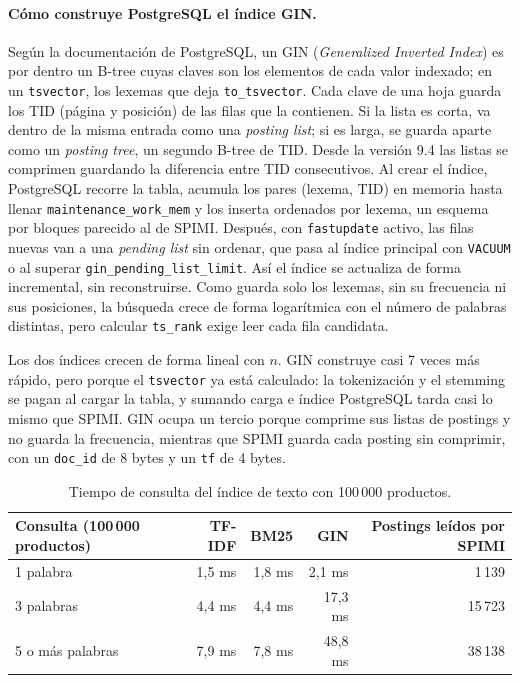 \documentclass[11pt,a4paper]{article}
\begin{document}
\paragraph{Cómo construye PostgreSQL el índice GIN.} Según la documentación de PostgreSQL, un GIN (\emph{Generalized Inverted Index}) es por dentro un B-tree cuyas claves son los elementos de cada valor indexado; en un \texttt{tsvector}, los lexemas que deja \texttt{to\_tsvector}. Cada clave de una hoja guarda los TID (página y posición) de las filas que la contienen. Si la lista es corta, va dentro de la misma entrada como una \emph{posting list}; si es larga, se guarda aparte como un \emph{posting tree}, un segundo B-tree de TID. Desde la versión 9.4 las listas se comprimen guardando la diferencia entre TID consecutivos. Al crear el índice, PostgreSQL recorre la tabla, acumula los pares (lexema, TID) en memoria hasta llenar \texttt{maintenance\_work\_mem} y los inserta ordenados por lexema, un esquema por bloques parecido al de SPIMI. Después, con \texttt{fastupdate} activo, las filas nuevas van a una \emph{pending list} sin ordenar, que pasa al índice principal con \texttt{VACUUM} o al superar \texttt{gin\_pending\_list\_limit}. Así el índice se actualiza de forma incremental, sin reconstruirse. Como guarda solo los lexemas, sin su frecuencia ni sus posiciones, la búsqueda crece de forma logarítmica con el número de palabras distintas, pero calcular \texttt{ts\_rank} exige leer cada fila candidata.

Los dos índices crecen de forma lineal con $n$. GIN construye casi 7 veces más rápido, pero porque el \texttt{tsvector} ya está calculado: la tokenización y el stemming se pagan al cargar la tabla, y sumando carga e índice PostgreSQL tarda casi lo mismo que SPIMI. GIN ocupa un tercio porque comprime sus listas de postings y no guarda la frecuencia, mientras que SPIMI guarda cada posting sin comprimir, con un \texttt{doc\_id} de 8 bytes y un \texttt{tf} de 4 bytes.

\begin{table}[H]
\centering
\begin{tabular}{lrrrr}
\toprule
Consulta (100\,000 productos) & TF-IDF & BM25 & GIN & Postings leídos por SPIMI \\
\midrule
1 palabra & 1,5 ms & 1,8 ms & 2,1 ms & 1\,139 \\
3 palabras & 4,4 ms & 4,4 ms & 17,3 ms & 15\,723 \\
5 o más palabras & 7,9 ms & 7,8 ms & 48,8 ms & 38\,138 \\
\bottomrule
\end{tabular}
\caption{Tiempo de consulta del índice de texto con 100\,000 productos.}
\end{table}
\end{document}
